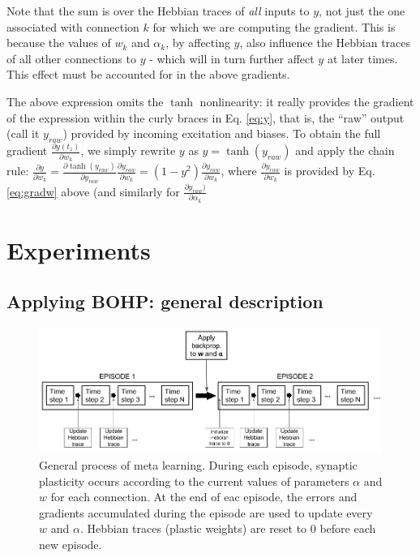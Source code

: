 \documentclass{article}
\begin{document}
Note that the sum is over the Hebbian traces of \emph{all} inputs to $y$, not just the
one associated with connection $k$ for which we are computing the gradient. This is because the values of $w_k$ and
$\alpha_k$, by affecting $y$, also influence the Hebbian traces of all other
connections to $y$ - which will in turn further affect $y$ at later times. This effect must be accounted for in the above gradients.

The above expression omits the $\tanh$ nonlinearity: it really provides the
gradient of the expression within the curly braces in Eq. \ref{eq:y}, that is,
the ``raw'' output (call it $y_{raw}$) provided by incoming excitation and biases. To obtain
the full gradient $\frac{\partial y(t_z)}{\partial w_k}$, we simply rewrite $y$ as $y =
\tanh(y_{raw})$ and apply the chain rule: $\frac{\partial y}{\partial w_k} =
\frac{\partial \tanh(y_{raw})}{\partial y_{raw}} \frac{\partial y_{raw}}{\partial
w_k} = (1 - y^2)\frac{\partial y_{raw}}{\partial w_k}$, where $\frac{\partial
y_{raw}}{\partial w_k}$ is provided by Eq. \ref{eq:gradw} above (and similarly
for $\frac{\partial
y_{raw})}{\partial \alpha_k}$ 

\section{Experiments}

\subsection{Applying BOHP: general description}

\begin{figure} \includegraphics[scale=0.5]{MetaLearning.png} \caption{General
process of meta learning. During each episode, synaptic plasticity occurs
according to the current values of parameters $\alpha$ and $w$ for each
connection. At the end of eac episode, the errors and gradients accumulated during the
episode are used to update every $w$ and $\alpha$. Hebbian traces (plastic weights) are reset to 0 before each new episode.
} 
\label{fig:metalearning}
\end{figure}
\end{document}
